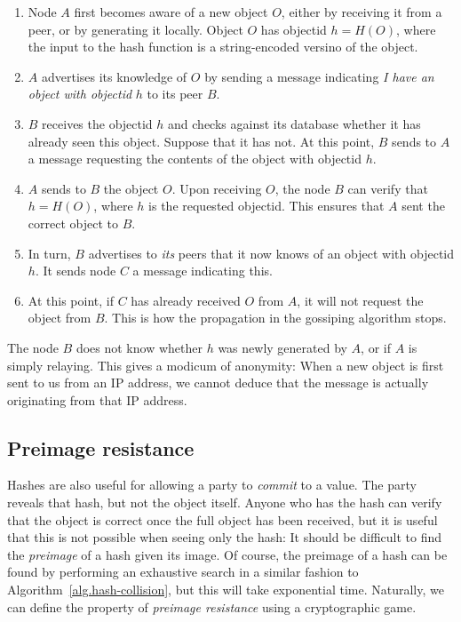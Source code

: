 \begin{enumerate}
  \item Node $A$ first becomes aware of a new object $O$, either by receiving it from a peer,
        or by generating it locally. Object $O$ has objectid $h = H(O)$, where the input to the
        hash function is a string-encoded versino of the object.
  \item $A$ advertises its knowledge of $O$ by sending a message
        indicating \emph{I have an object with objectid} $h$ to its peer $B$.
  \item $B$ receives the objectid $h$ and checks against its database whether it has already seen
        this object. Suppose that it has not. At this point, $B$ sends to $A$ a message
        requesting the contents of the object with objectid $h$.
  \item $A$ sends to $B$ the object $O$. Upon receiving $O$, the node $B$ can verify that
        $h = H(O)$, where $h$ is the requested objectid. This ensures that $A$ sent the
        correct object to $B$.
  \item In turn, $B$ advertises to \emph{its} peers that it now knows of an object with
        objectid $h$. It sends node $C$ a message indicating this.
  \item At this point, if $C$ has already received $O$ from $A$, it will not request
        the object from $B$. This is how the propagation in the gossiping algorithm stops.
\end{enumerate}

The node $B$ does not know whether $h$ was newly generated by $A$, or if $A$ is simply relaying.
This gives a modicum of anonymity: When a new object is first sent to us from an IP address,
we cannot deduce that the message is actually originating from that IP address.

\subsection*{Preimage resistance}

Hashes are also useful for allowing a party to \emph{commit} to a value. The party
reveals that hash, but not the object itself. Anyone who has the hash can verify that
the object is correct once the full object has been received, but it is useful that
this is not possible when seeing only the hash: It should be difficult to find the
\emph{preimage} of a hash given its image. Of course, the preimage of a hash can
be found by performing an exhaustive search in a similar fashion to
Algorithm~\ref{alg.hash-collision}, but this will take exponential time.
Naturally, we can define the property of \emph{preimage resistance} using a
cryptographic game.

